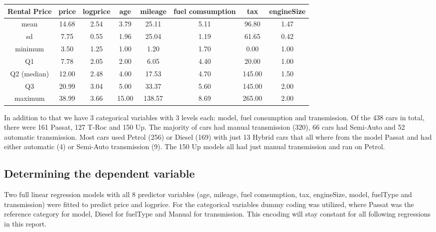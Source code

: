 \documentclass[12 pt]{scrartcl}
\begin{document}
\begin{table}[ht]
  \centering
  \label{tab:descriptives}
  \begin{tabular}{c|cc|ccccc}
    Rental Price & price & logprice & age   & mileage & fuel comsumption & tax    & engineSize \\
    \hline
    mean         & 14.68 & 2.54     & 3.79  & 25.11   & 5.11             & 96.80  & 1.47       \\
    sd           & 7.75  & 0.55     & 1.96  & 25.04   & 1.19             & 61.65  & 0.42       \\
    minimum      & 3.50  & 1.25     & 1.00  & 1.20    & 1.70             & 0.00   & 1.00       \\
    Q1           & 7.78  & 2.05     & 2.00  & 6.05    & 4.40             & 20.00  & 1.00       \\
    Q2 (median)  & 12.00 & 2.48     & 4.00  & 17.53   & 4.70             & 145.00 & 1.50       \\
    Q3           & 20.99 & 3.04     & 5.00  & 33.37   & 5.60             & 145.00 & 2.00       \\
    maximum      & 38.99 & 3.66     & 15.00 & 138.57  & 8.69             & 265.00 & 2.00
  \end{tabular}
\end{table}

In addition to that we have 3 categorical variables with 3 levels each: model, fuel consumption and transmission. Of the 438 cars in total, there were 161 Passat, 127 T-Roc and 150 Up. The majority of cars had manual transmission (320), 66 cars had Semi-Auto and 52 automatic transmission. Most cars used Petrol (256) or Diesel (169) with just 13 Hybrid cars that all where from the model Passat and had either automatic (4) or Semi-Auto transmission (9). The 150 Up models all had just manual transmission and ran on Petrol.

\subsection{Determining the dependent variable}

Two full linear regression models with all 8 predictor variables (age, mileage, fuel comsumption, tax, engineSize, model, fuelType and transmission) were fitted to predict price and logprice. For the categorical variables dummy coding was utilized, where Passat was the reference category for model, Diesel for fuelType and Manual for transmission. This encoding will stay constant for all following regressions in this report.
\end{document}

